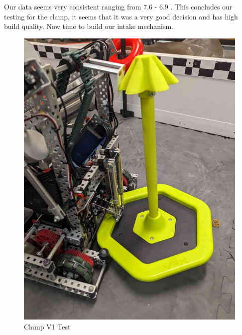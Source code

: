 Our data seems very consistent ranging from 7.6 \degree - 6.9 \degree. This concludes our testing for the clamp, it seems that it was a very good decision and has high build quality. Now time to build our intake mechanism.

\pagebreak

\begin{figure}[h!] %
    \begin{minipage}{.5\textwidth}
        \centering
        \includegraphics[width=.8\linewidth]{images/Clamp Test V1.jpg}
        \caption{Clamp V1 Test}
        \label{fig:clamp-v1-test}
    \end{minipage}
    \begin{minipage}{.5\textwidth}
        \centering

\end{minipage}
\end{figure}
